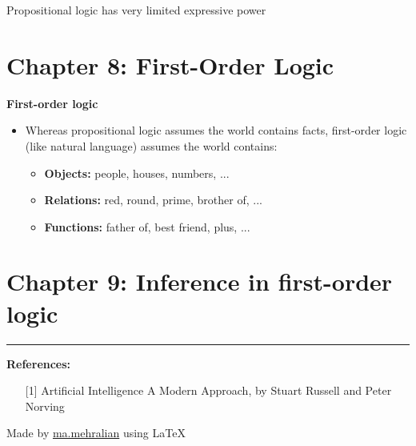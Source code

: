 \documentclass{../cheat}
\begin{document}
\begin{multicols}{3}
		Propositional logic has very limited expressive power 

 		
	\section{Chapter 8: First-Order Logic}
	\textbf{First-order logic}
	\begin{itemize}
		\item Whereas propositional logic assumes the world contains facts, first-order logic (like natural language) assumes the world contains:
		\begin{itemize}
			\item \textbf{Objects:} people, houses, numbers, ...
			\item \textbf{Relations:} red, round, prime, brother of, ...
			\item \textbf{Functions:} father of, best friend, plus, ...
		\end{itemize}
	\end{itemize}



	
	\section{Chapter 9: Inference in first-order logic}
  
\vspace{5mm}
\rule{0.3\linewidth}{0.25pt}
\scriptsize

\textbf{References:}
\begin{itemize}[leftmargin=2em]
	\item [{[1]}] Artificial Intelligence A Modern Approach, by Stuart Russell and Peter Norving 

\end{itemize}
Made by \href{http://webpages.iust.ac.ir/mehralian/}{ma.mehralian} using \LaTeX
\end{multicols}
\end{document}
